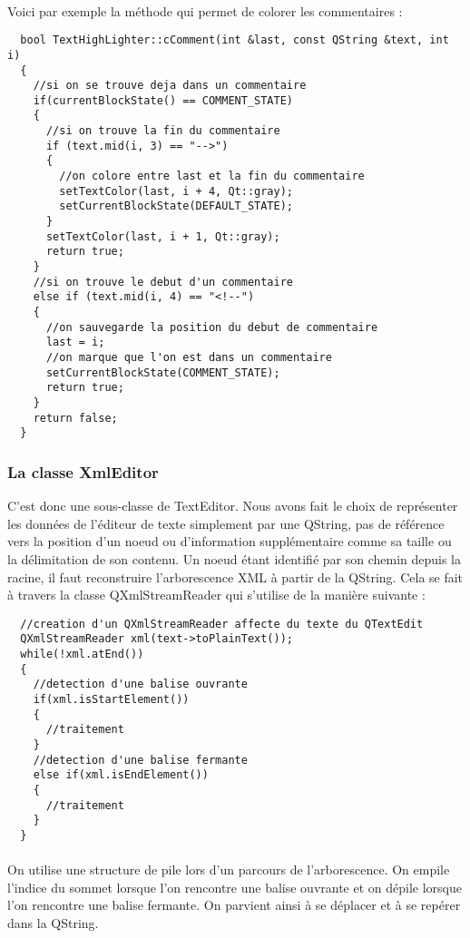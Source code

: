 \paragraph{}
Voici par exemple la méthode qui permet de colorer les commentaires :
\begin{lstlisting}
  bool TextHighLighter::cComment(int &last, const QString &text, int i)
  {
    //si on se trouve deja dans un commentaire
    if(currentBlockState() == COMMENT_STATE)
    {
      //si on trouve la fin du commentaire
      if (text.mid(i, 3) == "-->")
      {
        //on colore entre last et la fin du commentaire
        setTextColor(last, i + 4, Qt::gray);
        setCurrentBlockState(DEFAULT_STATE);
      }
      setTextColor(last, i + 1, Qt::gray);
      return true;
    }
    //si on trouve le debut d'un commentaire
    else if (text.mid(i, 4) == "<!--")
    {
      //on sauvegarde la position du debut de commentaire
      last = i;
      //on marque que l'on est dans un commentaire
      setCurrentBlockState(COMMENT_STATE);
      return true;
    }
    return false;
  }
\end{lstlisting}
\paragraph{}
\subsubsection{La classe XmlEditor}

C'est donc une sous-classe de TextEditor. Nous avons fait le choix de représenter les données de l'éditeur de texte simplement par une QString, pas de référence vers la position d'un noeud ou d'information supplémentaire comme sa taille ou la délimitation de son contenu.
Un noeud étant identifié par son chemin depuis la racine, il faut reconstruire l'arborescence XML à partir de la QString. Cela se fait à travers la classe QXmlStreamReader qui s'utilise de la manière suivante :
\begin{lstlisting}
  //creation d'un QXmlStreamReader affecte du texte du QTextEdit
  QXmlStreamReader xml(text->toPlainText());
  while(!xml.atEnd())
  {
    //detection d'une balise ouvrante
    if(xml.isStartElement())
    {
      //traitement
    }
    //detection d'une balise fermante
    else if(xml.isEndElement())
    {
      //traitement
    }
  }
\end{lstlisting}
\paragraph{}
On utilise une structure de pile lors d'un parcours de l'arborescence. On empile l'indice du sommet lorsque l'on rencontre une balise ouvrante et on dépile lorsque l'on rencontre une balise fermante.
On parvient ainsi à se déplacer et à se repérer dans la QString.


